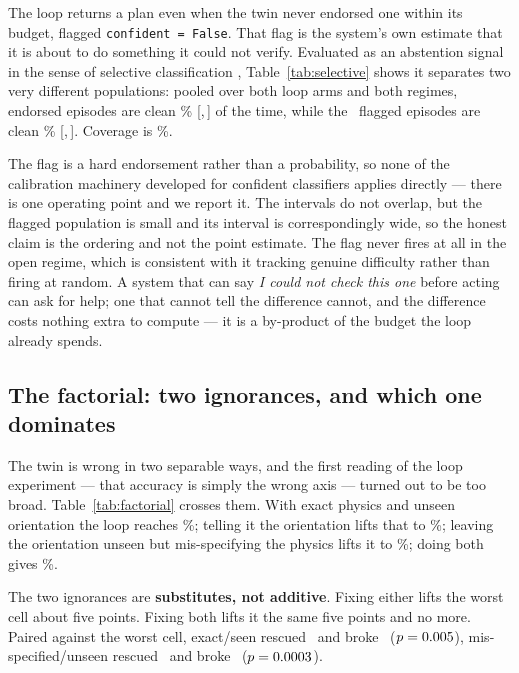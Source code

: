 \documentclass[11pt,a4paper]{article}
\newcommand{\ci}[2]{{\footnotesize\color{black!55}[#1,\,#2]}}
\begin{document}
The loop returns a plan even when the twin never endorsed one within its budget,
flagged \texttt{confident = False}. That flag is the system's own estimate that
it is about to do something it could not verify. Evaluated as an abstention
signal in the sense of selective classification
\citep{elyaniv2010foundations,geifman2017selective},
Table~\ref{tab:selective} shows it separates two very different populations:
pooled over both loop arms and both regimes, endorsed episodes are clean
\numSelPoolEnd\% \ci{\numSelPoolEndLo}{\numSelPoolEndHi} of the time, while the
\numSelPoolNUn\ flagged episodes are clean \numSelPoolUn\%
\ci{\numSelPoolUnLo}{\numSelPoolUnHi}. Coverage is \numSelPoolCov\%.

The flag is a hard endorsement rather than a probability, so none of the
calibration machinery developed for confident classifiers
\citep{guo2017calibration} applies directly --- there is one operating point and
we report it. The intervals do not overlap, but the flagged population is small and its
interval is correspondingly wide, so the honest claim is the ordering and not the
point estimate. The flag never fires at all in the open regime, which is
consistent with it tracking genuine difficulty rather than firing at random. A
system that can say \emph{I could not check this one} before acting can ask for
help; one that cannot tell the difference cannot, and the difference costs
nothing extra to compute --- it is a by-product of the budget the loop already
spends.

\subsection{The factorial: two ignorances, and which one dominates}
\label{sec:factorial}

The twin is wrong in two separable ways, and the first reading of the loop
experiment ---
that accuracy is simply the wrong axis --- turned out to be too broad.
Table~\ref{tab:factorial} crosses them. With exact physics and unseen
orientation the loop reaches \numFacExactBlind\%; telling it the orientation
lifts that to \numFacExactSeen\%; leaving the orientation unseen but
mis-specifying the physics lifts it to \numFacWrongBlind\%; doing both gives
\numFacWrongSeen\%.

The two ignorances are \textbf{substitutes, not additive}. Fixing either lifts
the worst cell about five points. Fixing both lifts it the same five points and
no more. Paired against the worst cell, exact/seen rescued
\numFacPairedExactphysicsyawknoResc\ and broke
\numFacPairedExactphysicsyawknoBroke\ ($p = 0.005$),
mis-specified/unseen rescued \numFacPairedMisspecifiedyawunsResc\ and broke
\numFacPairedMisspecifiedyawunsBroke\ ($p = 0.0003$).
\end{document}
